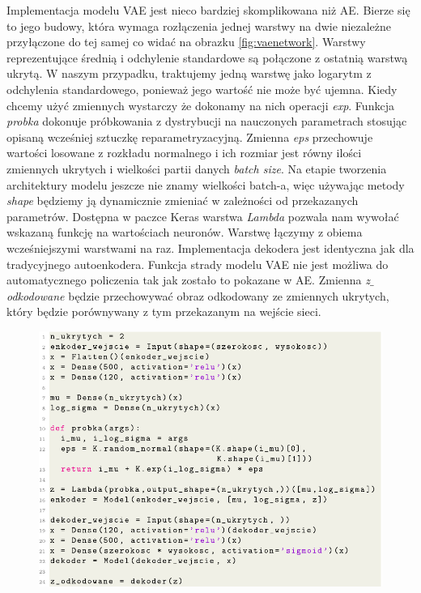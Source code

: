\documentclass[a4paper,12pt]{book} %
\begin{document}
Implementacja modelu VAE jest nieco bardziej skomplikowana niż AE. Bierze się to jego budowy, która wymaga rozłączenia jednej warstwy na dwie niezależne przyłączone do tej samej co widać na obrazku \ref{fig:vaenetwork}. Warstwy reprezentujące średnią i odchylenie standardowe są połączone z ostatnią warstwą ukrytą. W naszym przypadku, traktujemy jedną warstwę jako logarytm z odchylenia standardowego, ponieważ jego wartość nie może być ujemna. Kiedy chcemy użyć zmiennych wystarczy że dokonamy na nich operacji \textit{exp}. Funkcja \textit{probka} dokonuje próbkowania z dystrybucji na nauczonych parametrach stosując opisaną wcześniej sztuczkę reparametryzacyjną. Zmienna \textit{eps} przechowuje wartości losowane z rozkładu normalnego i ich rozmiar jest równy ilości zmiennych ukrytych i wielkości partii danych \textit{batch size}. Na etapie tworzenia architektury modelu jeszcze nie znamy wielkości batch-a, więc używając metody \textit{shape} będziemy ją dynamicznie zmieniać w zależności od przekazanych parametrów. Dostępna w paczce Keras warstwa \textit{Lambda} pozwala nam wywołać wskazaną funkcję na wartościach neuronów. Warstwę łączymy z obiema wcześniejszymi warstwami na raz. Implementacja dekodera jest identyczna jak dla tradycyjnego autoenkodera. Funkcja strady modelu VAE nie jest możliwa do automatycznego policzenia tak jak zostało to pokazane w AE. Zmienna \textit{z$\_$odkodowane} będzie przechowywać obraz odkodowany ze zmiennych ukrytych, który będzie porównywany z tym przekazanym na wejście sieci.

\begin{figure}[h!]
	\centering
	\includegraphics[width=\linewidth]{modelvae.pdf}
\end{figure}
\end{document}
